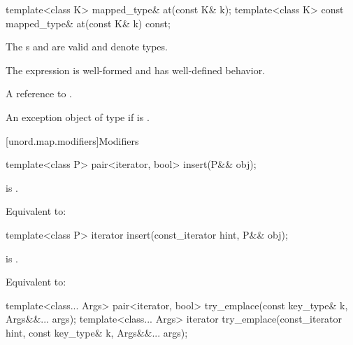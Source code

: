 %
%
\begin{itemdecl}
template<class K> mapped_type&       at(const K& k);
template<class K> const mapped_type& at(const K& k) const;
\end{itemdecl}

\begin{itemdescr}
\pnum
\constraints
The s  and
 are valid and denote types.

\pnum
\expects
The expression  is well-formed and has well-defined behavior.

\pnum
\returns
A reference to .

\pnum
\throws
An exception object of type 
if  is .
\end{itemdescr}

[unord.map.modifiers]{Modifiers}

%
\begin{itemdecl}
template<class P>
  pair<iterator, bool> insert(P&& obj);
\end{itemdecl}

\begin{itemdescr}

\pnum
\constraints
{} is .

\pnum
\effects
Equivalent to: 
\end{itemdescr}

%
\begin{itemdecl}
template<class P>
  iterator insert(const_iterator hint, P&& obj);
\end{itemdecl}

\begin{itemdescr}
\pnum
\constraints
{} is .

\pnum
\effects
Equivalent to:
\end{itemdescr}

%
\begin{itemdecl}
template<class... Args>
  pair<iterator, bool> try_emplace(const key_type& k, Args&&... args);
template<class... Args>
  iterator try_emplace(const_iterator hint, const key_type& k, Args&&... args);
\end{itemdecl}

